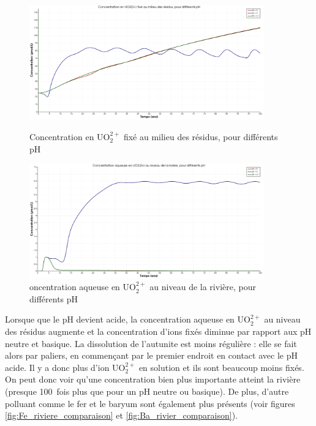 \documentclass{article}
\begin{document}
\begin{figure}[H]
    \centering
    \begin{minipage}{0.5\textwidth}
        \centering
        \includegraphics[width=0.9\textwidth]{III_B_2_11.png} 
        \caption{Concentration en UO$_2^{2+}$ fixé au milieu des résidus, pour différents pH}
        \label{fig:UO2_fixe_residus_comparaison}
    \end{minipage}\hfill
    \begin{minipage}{0.5\textwidth}
        \centering
        \includegraphics[width=0.9\textwidth]{III_B_2_12.png} 
        \caption{oncentration aqueuse en UO$_2^{2+}$ au niveau de la rivière, pour différents pH}
        \label{fig:UO2_riviere_comparaison}
    \end{minipage}
\end{figure}


Lorsque que le pH devient acide, la concentration aqueuse en UO$_2^{2+}$ au niveau des résidus augmente et la concentration d’ions fixés diminue par rapport aux pH neutre et basique. La dissolution de l’autunite est moins régulière : elle se fait alors par paliers, en commençant par le premier endroit en contact avec le pH acide. Il y a donc plus d’ion UO$_2^{2+}$ en solution et ils sont beaucoup moins fixés. On peut donc voir qu’une concentration bien plus importante atteint la rivière (presque 100~fois plus que pour un pH neutre ou basique). De plus, d’autre polluant comme le fer et le baryum sont également plus présents (voir figures \ref{fig:Fe_riviere_comparaison} et \ref{fig:Ba_rivier_comparaison}).
\end{document}
